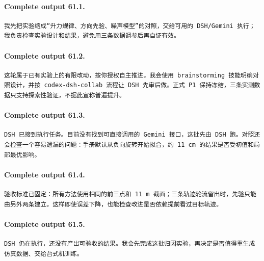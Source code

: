 \documentclass[UTF8,10pt]{ctexart}
\begin{document}
\paragraph{Complete output 61.1.}
\begin{Verbatim}[breaklines=true,breakanywhere=true,fontsize=\scriptsize,frame=single,framesep=2pt]
我先把实验缩成“升力规律、方向先验、噪声模型”的对照，交给可用的 DSH/Gemini 执行；我负责检查实验设计和结果，避免用三条数据调参后再自证有效。
\end{Verbatim}

\paragraph{Complete output 61.2.}
\begin{Verbatim}[breaklines=true,breakanywhere=true,fontsize=\scriptsize,frame=single,framesep=2pt]
这轮属于已有实验上的有限改动，按你授权自主推进。我会使用 brainstorming 技能明确对照设计，并按 codex-dsh-collab 流程让 DSH 先审后做。正式 P1 保持冻结，三条实测数据只支持探索性验证，不据此宣称普遍提升。
\end{Verbatim}

\paragraph{Complete output 61.3.}
\begin{Verbatim}[breaklines=true,breakanywhere=true,fontsize=\scriptsize,frame=single,framesep=2pt]
DSH 已接到执行任务。目前没有找到可直接调用的 Gemini 接口，这批先由 DSH 跑。对照还会检查一个容易遗漏的问题：手册默认从负向旋转开始拟合，约 11 cm 的结果是否受初值和局部最优影响。
\end{Verbatim}

\paragraph{Complete output 61.4.}
\begin{Verbatim}[breaklines=true,breakanywhere=true,fontsize=\scriptsize,frame=single,framesep=2pt]
验收标准已固定：所有方法使用相同的前三点和 11 m 截面；三条轨迹轮流留出时，先验只能由另外两条建立。这样即使误差下降，也能检查改进是否依赖提前看过目标轨迹。
\end{Verbatim}

\paragraph{Complete output 61.5.}
\begin{Verbatim}[breaklines=true,breakanywhere=true,fontsize=\scriptsize,frame=single,framesep=2pt]
DSH 仍在执行，还没有产出可验收的结果。我会先完成这批归因实验，再决定是否值得重生成仿真数据、交给台式机训练。
\end{Verbatim}
\end{document}
